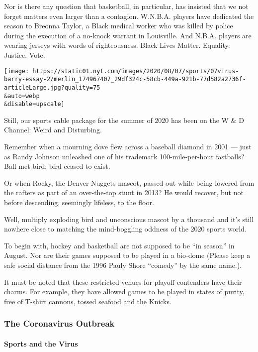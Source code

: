 Nor is there any question that basketball, in particular, has insisted
that we not forget matters even larger than a contagion. W.N.B.A.
players have dedicated the season to Breonna Taylor, a Black medical
worker who was killed by police during the execution of a no-knock
warrant in Louisville. And N.B.A. players are wearing jerseys with words
of righteousness. Black Lives Matter. Equality. Justice. Vote.

\texttt{[image: https://static01.nyt.com/images/2020/08/07/sports/07virus-barry-essay-2/merlin\_174967407\_29df324c-58cb-449a-921b-77d582a2736f-articleLarge.jpg?quality=75\\\&auto=webp\\\&disable=upscale]}

Still, our sports cable package for the summer of 2020 has been on the W
\& D Channel: Weird and Disturbing.

Remember when a mourning dove flew across a baseball diamond in 2001 ---
just as Randy Johnson unleashed one of his trademark 100-mile-per-hour
fastballs? Ball met bird; bird ceased to exist.

Or when Rocky, the Denver Nuggets mascot, passed out while being lowered
from the rafters as part of an over-the-top stunt in 2013? He would
recover, but not before descending, seemingly lifeless, to the floor.

Well, multiply exploding bird and unconscious mascot by a thousand and
it's still nowhere close to matching the mind-boggling oddness of the
2020 sports world.

To begin with, hockey and basketball are not supposed to be ``in
season'' in August. Nor are their games supposed to be played in a
bio-dome (Please keep a safe social distance from the 1996 Pauly Shore
``comedy'' by the same name.).

It must be noted that these restricted venues for playoff contenders
have their charms. For example, they have allowed games to be played in
states of purity, free of T-shirt cannons, tossed seafood and the
Knicks.

\hypertarget{the-coronavirus-outbreak}{%
\subsubsection{The Coronavirus
Outbreak}\label{the-coronavirus-outbreak}}

\hypertarget{sports-and-the-virus}{%
\paragraph{Sports and the Virus}\label{sports-and-the-virus}}

